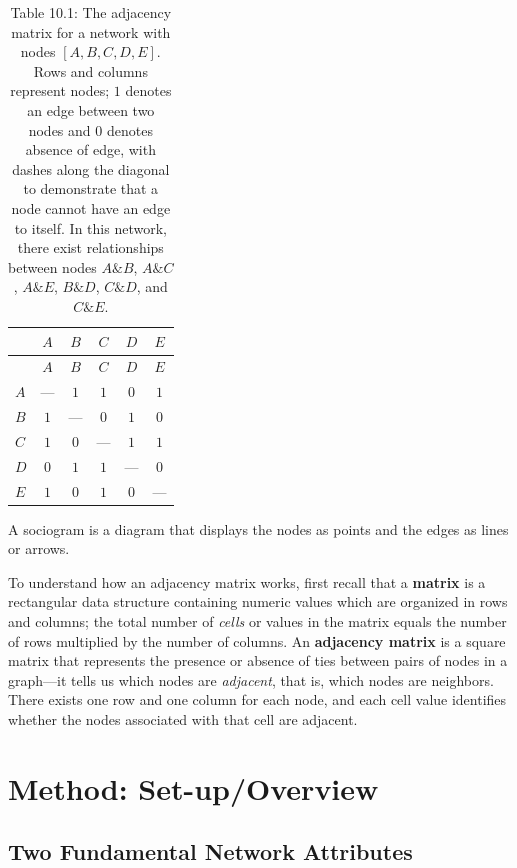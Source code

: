 \documentclass{book}
\begin{document}
\begin{longtable}[]{@{}lccccc@{}}
\caption{Table 10.1: The adjacency matrix for a network with nodes
\([A, B, C, D, E]\). Rows and columns represent nodes; \(1\) denotes an edge
between two nodes and \(0\) denotes absence of edge, with dashes along the
diagonal to demonstrate that a node cannot have an edge to itself. In this
network, there exist relationships between nodes \(A \& B\), \(A \& C\),
\(A \& E\), \(B \& D\), \(C \& D\), and \(C \& E\).}\tabularnewline
\toprule
& \(A\) & \(B\) & \(C\) & \(D\) & \(E\) \\
\midrule
\endfirsthead
\toprule
& \(A\) & \(B\) & \(C\) & \(D\) & \(E\) \\
\midrule
\endhead
\(A\) & --- & \(1\) & \(1\) & \(0\) & \(1\) \\
\(B\) & \(1\) & --- & \(0\) & \(1\) & \(0\) \\
\(C\) & \(1\) & \(0\) & --- & \(1\) & \(1\) \\
\(D\) & \(0\) & \(1\) & \(1\) & --- & \(0\) \\
\(E\) & \(1\) & \(0\) & \(1\) & \(0\) & --- \\
\bottomrule
\end{longtable}

A sociogram is a diagram that displays the nodes as points and the edges as
lines or arrows.

To understand how an adjacency matrix works, first recall that a
\textbf{matrix} is a rectangular data structure containing numeric values
which are organized in rows and columns; the total number of \emph{cells} or
values in the matrix equals the number of rows multiplied by the number of
columns. An \textbf{adjacency matrix} is a square matrix that represents the
presence or absence of ties between pairs of nodes in a graph---it tells us
which nodes are \emph{adjacent}, that is, which nodes are neighbors. There
exists one row and one column for each node, and each cell value identifies
whether the nodes associated with that cell are adjacent.

\hypertarget{method-set-upoverview}{%
\section{Method: Set-up/Overview}\label{method-set-upoverview}}

\hypertarget{two-fundamental-network-attributes}{%
\subsection{Two Fundamental Network
Attributes}\label{two-fundamental-network-attributes}}
\end{document}
